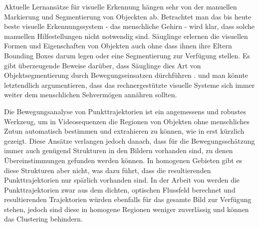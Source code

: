 Aktuelle Lernansätze für visuelle Erkennung hängen sehr von der manuellen Markierung und Segmentierung von Objeckten ab.
Betrachtet man das bis heute beste visuelle Erkennungssystem - das menschliche Gehirn - wird klar,
dass solche manuellen Hilfestellungen nicht notwendig sind. Säuglinge erlernen die visuellen Formen und
Eigenschaften von Objekten auch ohne dass ihnen ihre Eltern Bounding Boxes darum legen oder eine Segmentierung zur Verfügung stellen.
Es gibt überzeugende Beweise darüber, dass Säuglinge dies Art von Objektsegmentierung durch Bewegungseinsatzen dürchführen \cite{}.
und man könnte letztendlich argumentieren, dass das rechnergestützte visuelle Systeme sich immer weiter dem menschlichen Sehvermögen annähren sollten.

Die Bewegungsanalyse von Punkttrajektorien ist ein angemessens und robustes Werkzeug, um in Videosequenzen die Regionen von Objekten ohne
menschliches Zutun automatisch bestimmen und extrahieren zu können, wie in \cite{} erst kürzlich gezeigt. Diese Ansätze verlangen jedoch danach, dass für die Bewegungsschätzung immer auch genügend Strukturen in den Bildern vorhanden sind, zu denen Übereinstimmungen gefunden werden können.
In homogenen Gebieten gibt es diese Strukturen aber nicht, was dazu führt, dass die resultierenden Punkttrajektorien nur spärlich vorhanden sind.
In der Arbeit von \cite{} werden die Punkttrajektorien zwar aus dem dichten, optischen Flussfeld berechnet und resultierenden Trajektorien würden
ebenfalls für das gesamte Bild zur Verfügung stehen, jedoch sind diese in homogene Regionen weniger zuverlässig und können das Clustering behindern.